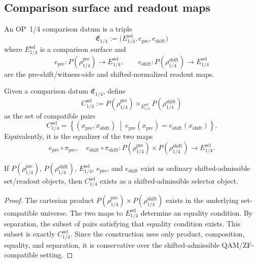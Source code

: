 \subsection{Comparison surface and readout maps}
\label{subsec:v410r07-comparison-surface-readout-maps}

\begin{definition}
\label{def:v410r07-op14-comparison-datum}
An OP~1/4 comparison datum is a triple
\[
 \mathfrak E_{1/4}
 :=
 \bigl(E_{1/4}^{\mathrm{sel}},
 e_{\mathrm{pre}},
 e_{\mathrm{shift}}\bigr)
\]
where \(E_{1/4}^{\mathrm{sel}}\) is a comparison surface and
\[
 e_{\mathrm{pre}}:
 P(\rho_{1/4}^{\mathrm{pre}})
 \longrightarrow
 E_{1/4}^{\mathrm{sel}},
 \qquad
 e_{\mathrm{shift}}:
 P(\rho_{1/4}^{\mathrm{shift}})
 \longrightarrow
 E_{1/4}^{\mathrm{sel}}
\]
are the pre-shift/witness-side and shifted-normalized readout maps.
\end{definition}

\begin{definition}
\label{def:v410r07-selector-as-fiber-product}
Given a comparison datum \(\mathfrak E_{1/4}\), define
\[
 C_{1/4}^{\mathrm{sel}}
 :=
 P(\rho_{1/4}^{\mathrm{pre}})
 \times_{E_{1/4}^{\mathrm{sel}}}
 P(\rho_{1/4}^{\mathrm{shift}})
\]
as the set of compatible pairs
\[
 C_{1/4}^{\mathrm{sel}}
 =
 \left\{
 (x_{\mathrm{pre}},x_{\mathrm{shift}})
 \ \middle|\
 e_{\mathrm{pre}}(x_{\mathrm{pre}})
 =
 e_{\mathrm{shift}}(x_{\mathrm{shift}})
 \right\}.
\]
Equivalently, it is the equalizer of the two maps
\[
 e_{\mathrm{pre}}\circ \pi_{\mathrm{pre}},
 \quad
 e_{\mathrm{shift}}\circ \pi_{\mathrm{shift}}
 :
 P(\rho_{1/4}^{\mathrm{pre}})
 \times
 P(\rho_{1/4}^{\mathrm{shift}})
 \longrightarrow
 E_{1/4}^{\mathrm{sel}}.
\]
\end{definition}

\begin{lemma}
\label{lem:v410r07-formal-selector-existence}
If \(P(\rho_{1/4}^{\mathrm{pre}})\), \(P(\rho_{1/4}^{\mathrm{shift}})\),
\(E_{1/4}^{\mathrm{sel}}\), \(e_{\mathrm{pre}}\), and \(e_{\mathrm{shift}}\)
exist as ordinary shifted-admissible set/readout objects, then
\(C_{1/4}^{\mathrm{sel}}\) exists as a shifted-admissible selector object.
\end{lemma}

\begin{proof}
The cartesian product
\(P(\rho_{1/4}^{\mathrm{pre}})\times P(\rho_{1/4}^{\mathrm{shift}})\)
exists in the underlying set-compatible universe. The two maps to
\(E_{1/4}^{\mathrm{sel}}\) determine an equality condition. By separation, the
subset of pairs satisfying that equality condition exists. This subset is
exactly \(C_{1/4}^{\mathrm{sel}}\). Since the construction uses only product,
composition, equality, and separation, it is conservative over the shifted-admissible
QAM/ZF-compatible setting.
\end{proof}

